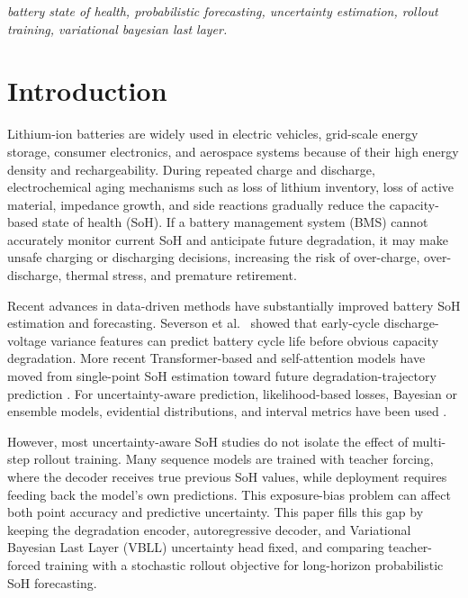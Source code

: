 \documentclass[conference]{IEEEtran}
\begin{document}
\vspace{\baselineskip}
\begin{IEEEkeywords}
\normalfont\itshape
battery state of health, probabilistic forecasting, uncertainty estimation,
rollout training, variational bayesian last layer.
\end{IEEEkeywords}

\section{Introduction}

Lithium-ion batteries are widely used in electric vehicles, grid-scale energy
storage, consumer electronics, and aerospace systems because of their high
energy density and rechargeability. During repeated charge and discharge,
electrochemical aging mechanisms such as loss of lithium inventory, loss of
active material, impedance growth, and side reactions gradually reduce the
capacity-based state of health (SoH). If a battery management system (BMS)
cannot accurately monitor current SoH and anticipate future degradation, it
may make unsafe charging or discharging decisions, increasing the risk of
over-charge, over-discharge, thermal stress, and premature retirement.

Recent advances in data-driven methods have substantially improved battery SoH
estimation and forecasting. Severson et al.~\cite{severson2019} showed
that early-cycle discharge-voltage variance features can predict battery cycle
life before obvious capacity degradation. More recent Transformer-based and
self-attention models have moved from single-point SoH estimation toward
future degradation-trajectory prediction \cite{bellomo2025transformersoh,
huang2026ic2ml,hu2025batterygpt}. For uncertainty-aware prediction,
likelihood-based losses, Bayesian or ensemble models, evidential
distributions, and interval metrics have been used
\cite{munna2026fusion,wang2026uqreview}.

However, most uncertainty-aware SoH studies do not isolate the effect of
multi-step rollout training. Many sequence models are trained with teacher
forcing, where the decoder receives true previous SoH values, while deployment
requires feeding back the model's own predictions. This exposure-bias problem
\cite{bengio2015scheduled} can affect both point accuracy and predictive
uncertainty. This paper fills this gap by keeping the degradation encoder,
autoregressive decoder, and Variational Bayesian Last Layer (VBLL) uncertainty
head fixed, and comparing teacher-forced training with a stochastic rollout
objective for long-horizon probabilistic SoH forecasting.
\end{document}
